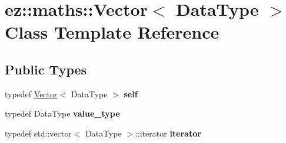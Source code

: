 \hypertarget{classez_1_1maths_1_1Vector}{}\section{ez\+:\+:maths\+:\+:Vector$<$ Data\+Type $>$ Class Template Reference}
\label{classez_1_1maths_1_1Vector}
\subsection*{Public Types}
\begin{DoxyCompactItemize}
\item 
\mbox{\label{classez_1_1maths_1_1Vector_a22eabac93ae9d2e2923dc1e3be6b7ca0}} 
typedef \hyperlink{classez_1_1maths_1_1Vector}{Vector}$<$ Data\+Type $>$ {\bfseries self}
\item 
\mbox{\label{classez_1_1maths_1_1Vector_ac3cc9e50502105ffad53a1c92d34e5f2}} 
typedef Data\+Type {\bfseries value\+\_\+type}
\item 
\mbox{\label{classez_1_1maths_1_1Vector_a2d84a0ccbbf9a0c4d4873501da68d851}} 
typedef std\+::vector$<$ Data\+Type $>$\+::iterator {\bfseries iterator}
\end{DoxyCompactItemize}
